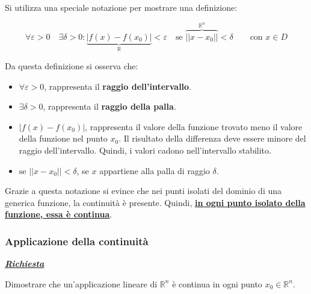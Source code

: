 \documentclass[a4paper]{article}
\begin{document}
	\noindent
	Si utilizza una speciale notazione per mostrare una definizione:
	
	\begin{equation*}
		\forall\varepsilon > 0 \hspace{1em} \exists\delta > 0 : \underbrace{\left|f\left(x\right) - f\left(x_{0}\right)\right|}_{\mathbb{R}} < \varepsilon \hspace{1em} \text{se } \overbrace{\Big||x-x_{0}|\Big|}^{\mathbb{R}^{n}} < \delta \hspace{2em} \text{con } x \in D
	\end{equation*}

	\noindent
	Da questa definizione si osserva che:
	
	\begin{itemize}
		\item $\forall\varepsilon > 0$, rappresenta il \textbf{raggio dell'intervallo}.
		
		\item $\exists\delta > 0$, rappresenta il \textbf{raggio della palla}.
		
		\item $\left|f\left(x\right) - f\left(x_{0}\right)\right|$, rappresenta il valore della funzione trovato meno il valore della funzione nel punto $x_{0}$. Il risultato della differenza deve essere minore del raggio dell'intervallo. Quindi, i valori cadono nell'intervallo stabilito.
		
		\item $\text{se } \Big||x-x_{0}|\Big| < \delta$, se $x$ appartiene alla palla di raggio $\delta$.
	\end{itemize}

	\noindent
	Grazie a questa notazione si evince che nei punti isolati del dominio di una generica funzione, la continuità è presente.
	Quindi, \textcolor{Red3}{\textbf{\underline{in ogni punto isolato della}}} \textcolor{Red3}{\textbf{\underline{funzione, essa è continua}}}.
	
	\newpage
	
	\subsubsection{Applicazione della continuità}
	
	\textcolor{Red3}{\textbf{\emph{\underline{Richiesta}}}}\newline
	
	\noindent
	Dimostrare che un'applicazione lineare di $\mathbb{R}^{n}$ è continua in ogni punto $x_{0} \in \mathbb{R}^{n}$.\newline
	
\end{document}
